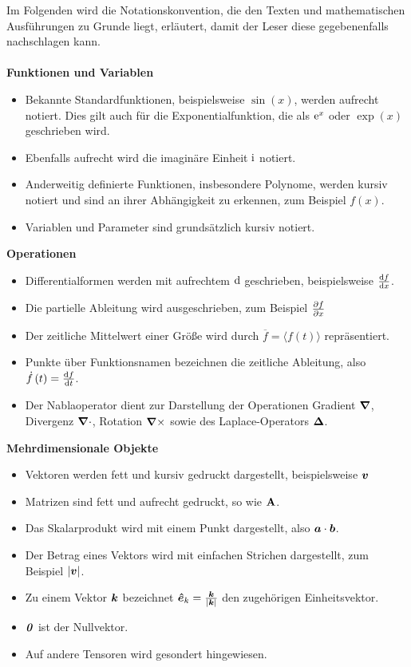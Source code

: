 \noindent Im Folgenden wird die Notationskonvention, die den Texten und mathematischen Ausführungen zu Grunde liegt, erläutert, damit der Leser diese gegebenenfalls nachschlagen kann. \\ \quad \\ 
{\bf Funktionen und Variablen}
\begin{itemize}
\item Bekannte Standardfunktionen, beispielsweise $\sin \left( x \right) $, werden aufrecht notiert. Dies gilt auch f\"ur die Exponentialfunktion, die als $\mathrm e^x$ oder $\exp \left( x \right)$ geschrieben wird.
\item Ebenfalls aufrecht wird die imagin\"are Einheit $\mathrm i$ notiert. 
\item Anderweitig definierte Funktionen, insbesondere Polynome, werden kursiv notiert und sind an ihrer Abh\"angigkeit zu erkennen, zum Beispiel $ f\left( x \right)$. 
\item Variablen und Parameter sind grunds\"atzlich kursiv notiert. 
\end{itemize}
{\bf Operationen}
\begin{itemize}
\item Differentialformen werden mit aufrechtem $\mathrm d$ geschrieben, beispielsweise $\frac{\mathrm d f}{\mathrm d x}$. 
\item Die partielle Ableitung wird ausgeschrieben, zum Beispiel $\frac{\partial f}{\partial x}$
\item Der zeitliche Mittelwert einer Gr\"oße wird durch $\overline f = \langle f \left( t \right) \rangle$ repr\"asentiert.  
\item Punkte \"uber Funktionsnamen bezeichnen die zeitliche Ableitung, also $\dot f \left( t \right) = \frac{\mathrm d f}{\mathrm d t} $. 
\item Der Nablaoperator dient zur Darstellung der Operationen Gradient $\boldsymbol \nabla$, Divergenz $\boldsymbol \nabla \cdot $, Rotation $\boldsymbol \nabla \times$ sowie des Laplace-Operators $\boldsymbol \Delta$. 
\end{itemize}
{\bf Mehrdimensionale Objekte}
\begin{itemize}
\item Vektoren werden fett und kursiv gedruckt dargestellt, beispielsweise $\boldsymbol v$
\item Matrizen sind fett und aufrecht gedruckt, so wie $ \mathbf A$. 
\item Das Skalarprodukt wird mit einem Punkt dargestellt, also $\boldsymbol a \cdot \boldsymbol b$.
\item Der Betrag eines Vektors wird mit einfachen Strichen dargestellt, zum Beispiel $\left|  \boldsymbol v \right|$.
\item Zu einem Vektor $\boldsymbol k $ bezeichnet $\boldsymbol{\hat e}_k = \frac{\boldsymbol k}{\left| \boldsymbol k \right|} $ den zugeh\"origen Einheitsvektor.
\item $\boldsymbol{\it 0}$ ist der Nullvektor.
\item Auf andere Tensoren wird gesondert hingewiesen.  
\end{itemize}
